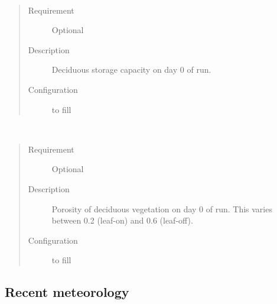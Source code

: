 \documentclass[letterpaper,10pt,english]{sphinxmanual}
\begin{document}

\begin{fulllineitems}
\label{\detokenize{input_files/Initial_Conditions/Vegetation_parameters:cmdoption-arg-decidcap0}}~\begin{quote}\begin{description}
\item[{Requirement}] \leavevmode
Optional

\item[{Description}] \leavevmode
Deciduous storage capacity on day 0 of run.

\item[{Configuration}] \leavevmode
to fill

\end{description}\end{quote}

\end{fulllineitems}


\begin{fulllineitems}
\label{\detokenize{input_files/Initial_Conditions/Vegetation_parameters:cmdoption-arg-porosity0}}~\begin{quote}\begin{description}
\item[{Requirement}] \leavevmode
Optional

\item[{Description}] \leavevmode
Porosity of deciduous vegetation on day 0 of run. This varies between 0.2 (leaf-on) and 0.6 (leaf-off).

\item[{Configuration}] \leavevmode
to fill

\end{description}\end{quote}

\end{fulllineitems}



\subsection{Recent meteorology}
\label{\detokenize{input_files/Initial_Conditions/Recent_meteorology:recent-meteorology}}\label{\detokenize{input_files/Initial_Conditions/Recent_meteorology::doc}}\label{\detokenize{input_files/Initial_Conditions/Recent_meteorology:id1}}
\end{document}
